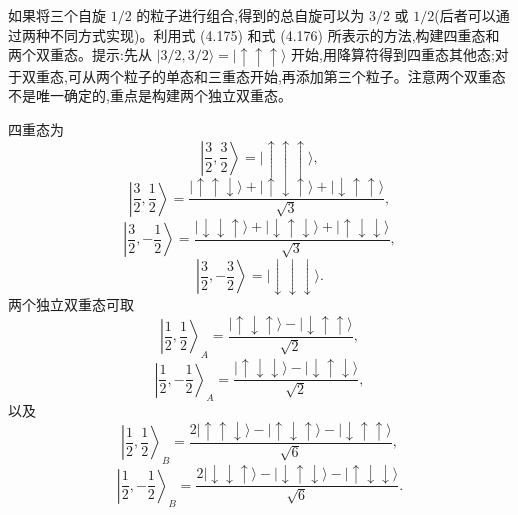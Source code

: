 \begin{question}
如果将三个自旋 $1/2$ 的粒子进行组合,得到的总自旋可以为 $3/2$ 或 $1/2$(后者可以通过两种不同方式实现)。利用式 (4.175) 和式 (4.176) 所表示的方法,构建四重态和两个双重态。提示:先从 $|3/2,3/2\rangle=|\uparrow\uparrow\uparrow\rangle$ 开始,用降算符得到四重态其他态;对于双重态,可从两个粒子的单态和三重态开始,再添加第三个粒子。注意两个双重态不是唯一确定的,重点是构建两个独立双重态。

\par\smallskip
{}

\end{question}
\begin{solution}

四重态为
\[
\left|\frac32,\frac32\right\rangle=|\uparrow\uparrow\uparrow\rangle,
\]
\[
\left|\frac32,\frac12\right\rangle=\frac{|\uparrow\uparrow\downarrow\rangle+|\uparrow\downarrow\uparrow\rangle+|\downarrow\uparrow\uparrow\rangle}{\sqrt3},
\]
\[
\left|\frac32,-\frac12\right\rangle=\frac{|\downarrow\downarrow\uparrow\rangle+|\downarrow\uparrow\downarrow\rangle+|\uparrow\downarrow\downarrow\rangle}{\sqrt3},
\]
\[
\left|\frac32,-\frac32\right\rangle=|\downarrow\downarrow\downarrow\rangle.
\]
两个独立双重态可取
\[
\left|\frac12,\frac12\right\rangle_A=\frac{|\uparrow\downarrow\uparrow\rangle-|\downarrow\uparrow\uparrow\rangle}{\sqrt2},
\]
\[
\left|\frac12,-\frac12\right\rangle_A=\frac{|\uparrow\downarrow\downarrow\rangle-|\downarrow\uparrow\downarrow\rangle}{\sqrt2},
\]
以及
\[
\left|\frac12,\frac12\right\rangle_B=\frac{2|\uparrow\uparrow\downarrow\rangle-|\uparrow\downarrow\uparrow\rangle-|\downarrow\uparrow\uparrow\rangle}{\sqrt6},
\]
\[
\left|\frac12,-\frac12\right\rangle_B=\frac{2|\downarrow\downarrow\uparrow\rangle-|\downarrow\uparrow\downarrow\rangle-|\uparrow\downarrow\downarrow\rangle}{\sqrt6}.
\]

\end{solution}

